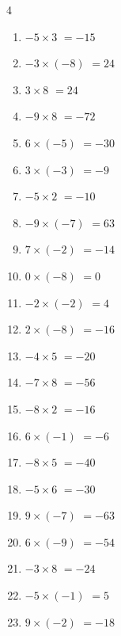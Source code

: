 \begin{multicols}{4}
\begin{enumerate}
  \item $-5\times 3$
        $=-15$

  \item $-3\times (-8)$
        $=24$

  \item $3\times 8$
        $=24$

  \item $-9\times 8$
        $=-72$

  \item $6\times (-5)$
        $=-30$

  \item $3\times (-3)$
        $=-9$

  \item $-5\times 2$
        $=-10$

  \item $-9\times (-7)$
        $=63$

  \item $7\times (-2)$
        $=-14$

  \item $0\times (-8)$
        $=0$

  \item $-2\times (-2)$
        $=4$

  \item $2\times (-8)$
        $=-16$

  \item $-4\times 5$
        $=-20$

  \item $-7\times 8$
        $=-56$

  \item $-8\times 2$
        $=-16$

  \item $6\times (-1)$
        $=-6$

  \item $-8\times 5$
        $=-40$

  \item $-5\times 6$
        $=-30$

  \item $9\times (-7)$
        $=-63$

  \item $6\times (-9)$
        $=-54$

  \item $-3\times 8$
        $=-24$

  \item $-5\times (-1)$
        $=5$

  \item $9\times (-2)$
        $=-18$


\end{enumerate}
\end{multicols}
